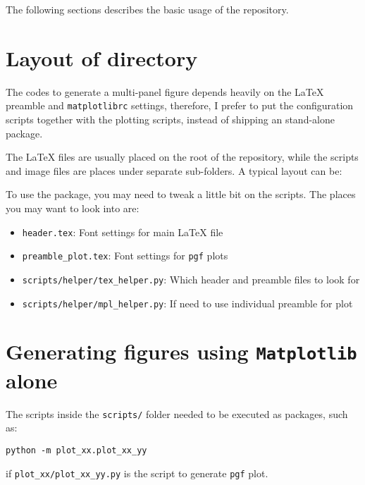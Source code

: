 The following sections describes the basic usage of the repository. 

\section{Layout of directory}
\label{sec:layout-directory}

The \py{} codes to generate a multi-panel figure depends heavily on
the \LaTeX{} preamble and \texttt{matplotlibrc} settings, therefore, I
prefer to put the configuration scripts together with the plotting
scripts, instead of shipping an stand-alone \py{} package.

The \LaTeX{} files are usually placed on the root of the repository,
while the \py{} scripts and image files are places under separate
sub-folders. A typical layout can be:
\vspace{1em}

To use the package, you may need to tweak a little bit on the \py{}
scripts. The places you may want to look into are:
\begin{itemize}
\item \verb|header.tex|: Font settings for main \LaTeX{} file
\item \verb|preamble_plot.tex|: Font settings for \texttt{pgf} plots
\item \verb|scripts/helper/tex_helper.py|: Which header and preamble files to look for
\item \verb|scripts/helper/mpl_helper.py|: If need to use individual preamble for \mpl{} plot
\end{itemize}

\section{Generating figures using \texttt{Matplotlib} alone}
\label{sec:matpl-only-figure}

The \py{} scripts inside the \texttt{scripts/} folder needed to be
executed as packages, such as:
\begin{verbatim}
python -m plot_xx.plot_xx_yy
\end{verbatim}
if \verb|plot_xx/plot_xx_yy.py| is the script to generate \texttt{pgf}
plot.

